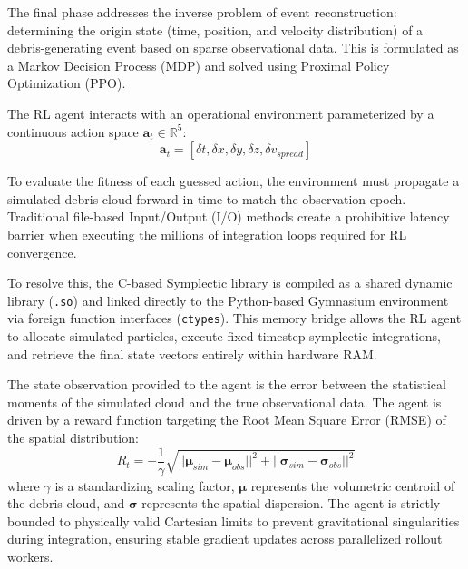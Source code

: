 \documentclass[letterpaper, paper,11pt]{AAS}
\begin{document}
The final phase addresses the inverse problem of event reconstruction: determining the origin state (time, position, and velocity distribution) of a debris-generating event based on sparse observational data. This is formulated as a Markov Decision Process (MDP) and solved using Proximal Policy Optimization (PPO).

The RL agent interacts with an operational environment parameterized by a continuous action space $\mathbf{a}_t \in \mathbb{R}^5$:
$$ \mathbf{a}_t = [\delta t, \delta x, \delta y, \delta z, \delta v_{spread}] $$

To evaluate the fitness of each guessed action, the environment must propagate a simulated debris cloud forward in time to match the observation epoch. Traditional file-based Input/Output (I/O) methods create a prohibitive latency barrier when executing the millions of integration loops required for RL convergence. 

To resolve this, the C-based Symplectic library is compiled as a shared dynamic library (\texttt{.so}) and linked directly to the Python-based Gymnasium environment via foreign function interfaces (\texttt{ctypes}). This memory bridge allows the RL agent to allocate simulated particles, execute fixed-timestep symplectic integrations, and retrieve the final state vectors entirely within hardware RAM.

The state observation provided to the agent is the error between the statistical moments of the simulated cloud and the true observational data. The agent is driven by a reward function targeting the Root Mean Square Error (RMSE) of the spatial distribution:
$$ R_t = - \frac{1}{\gamma} \sqrt{ ||\boldsymbol{\mu}_{sim} - \boldsymbol{\mu}_{obs}||^2 + ||\boldsymbol{\sigma}_{sim} - \boldsymbol{\sigma}_{obs}||^2 } $$
where $\gamma$ is a standardizing scaling factor, $\boldsymbol{\mu}$ represents the volumetric centroid of the debris cloud, and $\boldsymbol{\sigma}$ represents the spatial dispersion. The agent is strictly bounded to physically valid Cartesian limits to prevent gravitational singularities during integration, ensuring stable gradient updates across parallelized rollout workers.
\end{document}
